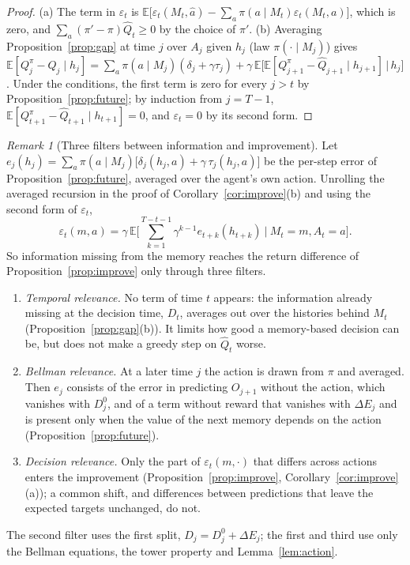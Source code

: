 \documentclass{article}
\theoremstyle{definition}
\theoremstyle{remark}
\newtheorem{remark}[proposition]{Remark}
\newcommand{\E}{\mathbb{E}}
\newcommand{\dE}{\Delta E}
\begin{document}
\begin{proof}
(a) The term in $\varepsilon_t$ is $\E\big[\varepsilon_t(M_t,\hat a)-\sum_a\pi(a\mid M_t)\varepsilon_t(M_t,a)\big]$, which is zero, and $\sum_a(\pi'-\pi)\hat Q_t\ge0$ by the choice of $\pi'$. (b) Averaging Proposition~\ref{prop:gap} at time $j$ over $A_j$ given $h_j$ (law $\pi(\cdot\mid M_j)$) gives $\E[Q^\pi_j-\hat Q_j\mid h_j]=\sum_a\pi(a\mid M_j)(\delta_j+\gamma\tau_j)+\gamma\,\E\big[\E[Q^\pi_{j+1}-\hat Q_{j+1}\mid h_{j+1}]\,\big|\,h_j\big]$. Under the conditions, the first term is zero for every $j>t$ by Proposition~\ref{prop:future}; by induction from $j=T-1$, $\E[Q^\pi_{t+1}-\hat Q_{t+1}\mid h_{t+1}]=0$, and $\varepsilon_t=0$ by its second form.
\end{proof}

\begin{remark}[Three filters between information and improvement]\label{rem:filters}
Let $e_j(h_j)=\sum_a\pi(a\mid M_j)\big[\delta_j(h_j,a)+\gamma\,\tau_j(h_j,a)\big]$ be the per-step error of Proposition~\ref{prop:future}, averaged over the agent's own action. Unrolling the averaged recursion in the proof of Corollary~\ref{cor:improve}(b) and using the second form of $\varepsilon_t$,
\[
\varepsilon_t(m,a)=\gamma\,\E\Big[\sum_{k=1}^{T-t-1}\gamma^{k-1}e_{t+k}(h_{t+k})\ \Big|\ M_t=m,A_t=a\Big].
\]
So information missing from the memory reaches the return difference of Proposition~\ref{prop:improve} only through three filters.
\begin{enumerate}
\item[(1)] \emph{Temporal relevance.} No term of time $t$ appears: the information already missing at the decision time, $D_t$, averages out over the histories behind $M_t$ (Proposition~\ref{prop:gap}(b)). It limits how good a memory-based decision can be, but does not make a greedy step on $\hat Q_t$ worse.
\item[(2)] \emph{Bellman relevance.} At a later time $j$ the action is drawn from $\pi$ and averaged. Then $e_j$ consists of the error in predicting $O_{j+1}$ without the action, which vanishes with $D^0_j$, and of a term without reward that vanishes with $\dE_j$ and is present only when the value of the next memory depends on the action (Proposition~\ref{prop:future}).
\item[(3)] \emph{Decision relevance.} Only the part of $\varepsilon_t(m,\cdot)$ that differs across actions enters the improvement (Proposition~\ref{prop:improve}, Corollary~\ref{cor:improve}(a)); a common shift, and differences between predictions that leave the expected targets unchanged, do not.
\end{enumerate}
The second filter uses the first split, $D_j=D^0_j+\dE_j$; the first and third use only the Bellman equations, the tower property and Lemma~\ref{lem:action}.
\end{remark}
\end{document}
